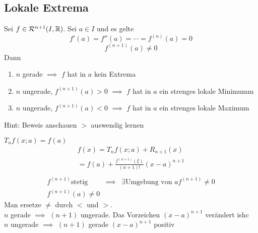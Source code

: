 \subsection{Lokale Extrema}
\begin{Sat}
  Sei $f\in\mathcal R^{n+1}(I,\mathbb{R})$. Sei $a\in I$ und es gelte
  \[f'(a)=f''(a)=\cdots=f^{(n)}(a)=0\]
  \[f^{(n+1)}(a)\neq 0\]
  Dann
  \begin{enumerate}
    \item $n$ gerade $\implies$ $f$ hat in $a$ kein Extrema
    \item $n$ ungerade, $f^{(n+1)}(a)>0$ $\implies$ $f$ hat in $a$ ein strenges lokale Minimumm
    \item $n$ ungerade, $f^{(n+1)}(a)<0$ $\implies$ $f$ hat in $a$ ein strenges lokale Maximum
  \end{enumerate}
  Hint: Beweis anschauen $>$ auswendig lernen
\end{Sat}
\begin{Bew}
  $T_nf(x;a)=f(a)$
  \begin{gather*}
    f(x)=T_nf(x;a)+R_{n+1}(x)\\
    =f(a)+\frac{f^{(n+1)}(\xi)}{(n+1)!}(x-a)^{n+1}\\
  \end{gather*}
  \begin{align*}
    f^{(n+1)} \text{stetig}& \implies & \exists \text{Umgebung von }a f^{(n+1)} \neq 0\\
    f^{(n+1)}(a)\neq 0
  \end{align*}
  Man ersetze $\neq$ durch $<$ und $>$.\\
  $n$ gerade $\implies$ $(n+1)$ ungerade. Das Vorzeichen $(x-a)^{n+1}$ verändert ishc \\
  $n$ ungerade $\implies$ $(n+1)$ gerade $(x-a)^{n+1}$ positiv
\end{Bew}
